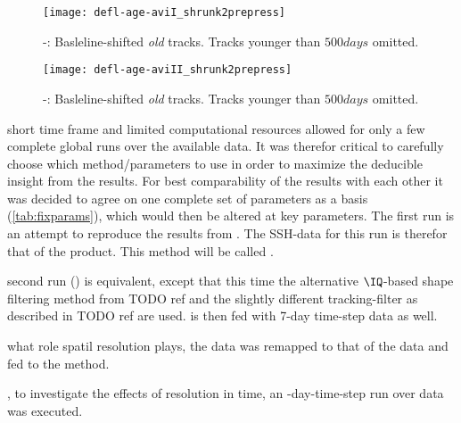 \begin{figure}
		\texttt{[image: defl-age-aviI\_shrunk2prepress]}
		\caption{\AVI-\MI: Basleline-shifted \textit{old} tracks. Tracks younger than
		$500 days$
\TODO{!}
		omitted.}
		\label{fig:defl-age-aviI_shrunk2prepress}
\end{figure}
\begin{figure}
		\texttt{[image: defl-age-aviII\_shrunk2prepress]}
		\caption{\AVI-\MII: Basleline-shifted \textit{old} tracks. Tracks younger than
		$500 days$
\TODO{!}
		  omitted.}
		\label{fig:defl-age-aviII_shrunk2prepress}
\end{figure}
 short time frame and limited computational resources allowed for only a few complete global runs over the available data.
It was therefor critical to carefully choose which method/parameters to use in order to maximize the deducible insight from the results.
For best comparability of the results with each other it was decided to agree on one complete set of parameters as a basis (\cref{tab:fixparams}), which would then be altered at key parameters.
The first run is an attempt to reproduce the results from \citet{Chelton2011}. The SSH-data for this run is therefor that of the \AVI product.
This method will be called \MI.

  second run (\MII) is equivalent, except that this time the alternative $\IQ$-based shape filtering method from TODO ref and the slightly different tracking-filter as described in TODO ref are used. \MII is then fed with 7-day time-step \POP data as well.

   what role spatil resolution plays, the \POP data was remapped to that of the \AVI data and fed to the \MI method.

, to investigate the effects of resolution in time, an -day-time-step run over \POP data was executed.

